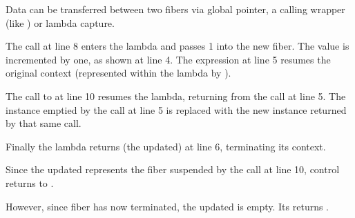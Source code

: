 
Data can be transferred between two fibers via global pointer, a calling
wrapper (like ) or lambda capture.

The \resume call at line 8 enters the lambda and passes 1 into the
new fiber. The value is incremented by one, as shown at line 4. The expression
 at line 5 resumes the original context (represented
within the lambda by ).

The call to  at line 10 resumes the lambda, returning from
the  call at line 5. The \fiber instance 
emptied by the \resume call at line 5 is replaced with the new instance
returned by that same \resume call.

Finally the lambda returns (the updated)  at line 6, terminating its
context.

Since the updated  represents the fiber suspended by the call at
line 10, control returns to \main.

However, since fiber  has now terminated, the updated 
is empty. Its \opbool returns .

